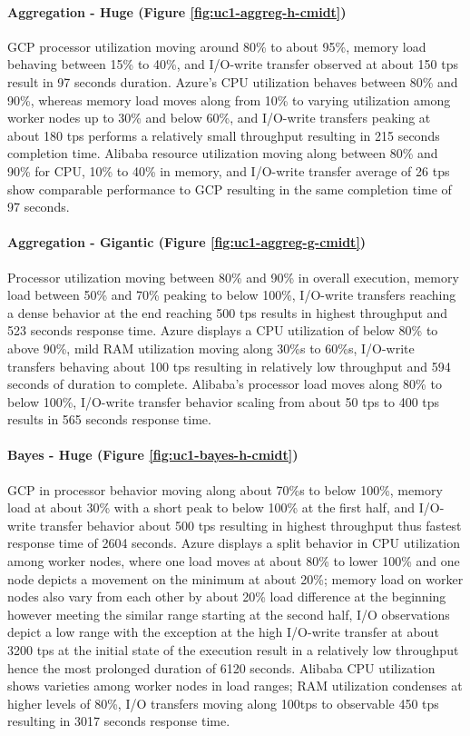 \documentclass[review]{elsarticle}
\begin{document}
\paragraph{Aggregation - Huge (Figure \ref{fig:uc1-aggreg-h-cmidt})}GCP processor utilization moving around 80\% to about 95\%, memory load behaving between 15\% to 40\%, and I/O-write transfer observed at about 150 tps result in 97 seconds duration. Azure's CPU utilization behaves between 80\% and 90\%, whereas memory load moves along from 10\% to varying utilization among worker nodes up to 30\% and below 60\%, and I/O-write transfers peaking at about 180 tps performs a relatively small throughput resulting in 215 seconds completion time. Alibaba resource utilization moving along between 80\% and 90\% for CPU, 10\% to 40\% in memory, and I/O-write transfer average of 26 tps show comparable performance to GCP resulting in the same completion time of 97 seconds.

\paragraph{Aggregation - Gigantic (Figure \ref{fig:uc1-aggreg-g-cmidt})}Processor utilization moving between 80\% and 90\% in overall execution, memory load between 50\% and 70\% peaking to below 100\%, I/O-write transfers reaching a dense behavior at the end reaching 500 tps results in highest throughput and 523 seconds response time. Azure displays a CPU utilization of below 80\% to above 90\%, mild RAM utilization moving along 30\%s to 60\%s, I/O-write transfers behaving about 100 tps resulting in relatively low throughput and 594 seconds of duration to complete. Alibaba's processor load moves along 80\% to below 100\%, I/O-write transfer behavior scaling from about 50 tps to 400 tps results in 565 seconds response time.

\paragraph{Bayes - Huge (Figure \ref{fig:uc1-bayes-h-cmidt})}GCP in processor behavior moving along about 70\%s to below 100\%, memory load at about 30\% with a short peak to below 100\% at the first half, and I/O-write transfer behavior about 500 tps resulting in highest throughput thus fastest response time of 2604 seconds. Azure displays a split behavior in CPU utilization among worker nodes, where one load moves at about 80\% to lower 100\% and one node depicts a movement on the minimum at about 20\%; memory load on worker nodes also vary from each other by about 20\% load difference at the beginning however meeting the similar range starting at the second half, I/O observations depict a low range with the exception at the high I/O-write transfer at about 3200 tps at the initial state of the execution result in a relatively low throughput hence the most prolonged duration of 6120 seconds. Alibaba CPU utilization shows varieties among worker nodes in load ranges; RAM utilization condenses at higher levels of 80\%, I/O transfers moving along 100tps to observable 450 tps resulting in 3017 seconds response time.
\end{document}

